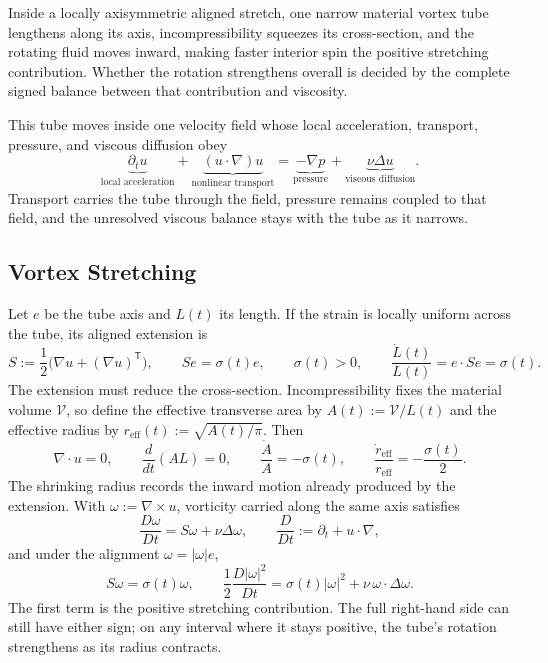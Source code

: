 
Inside a locally axisymmetric aligned stretch, one narrow material vortex tube lengthens along its axis, incompressibility squeezes its cross-section, and the rotating fluid moves inward, making faster interior spin the positive stretching contribution. Whether the rotation strengthens overall is decided by the complete signed balance between that contribution and viscosity.

This tube moves inside one velocity field whose local acceleration, transport, pressure, and viscous diffusion obey
\[
  \underbrace{\partial_t u}_{\text{local acceleration}}
  +
  \underbrace{(u\cdot\nabla)u}_{\text{nonlinear transport}}
  =
  \underbrace{-\nabla p}_{\text{pressure}}
  +
  \underbrace{\nu\Delta u}_{\text{viscous diffusion}}.
\]
Transport carries the tube through the field, pressure remains coupled to that field, and the unresolved viscous balance stays with the tube as it narrows.

\subsection{Vortex Stretching}\label{sub:ThePerfectlyStretchingVortex}

Let \(e\) be the tube axis and \(L(t)\) its length. If the strain is locally uniform across the tube, its aligned extension is
\[
  S:=\frac12\bigl(\nabla u+(\nabla u)^{\mathsf T}\bigr),
  \qquad
  Se=\sigma(t)e,
  \qquad
  \sigma(t)>0,
  \qquad
  \frac{\dot L(t)}{L(t)}
  =
  e\cdot Se
  =
  \sigma(t).
\]
The extension must reduce the cross-section. Incompressibility fixes the material volume \(\mathcal V\), so define the effective transverse area by \(A(t):=\mathcal V/L(t)\) and the effective radius by \(r_{\mathrm{eff}}(t):=\sqrt{A(t)/\pi}\). Then
\[
  \nabla\cdot u=0,
  \qquad
  \frac{d}{dt}(A L)=0,
  \qquad
  \frac{\dot A}{A}=-\sigma(t),
  \qquad
  \frac{\dot r_{\mathrm{eff}}}{r_{\mathrm{eff}}}
  =
  -\frac{\sigma(t)}{2}.
\]
The shrinking radius records the inward motion already produced by the extension. With \(\omega:=\nabla\times u\), vorticity carried along the same axis satisfies
\[
  \frac{D\omega}{Dt}
  =
  S\omega+\nu\Delta\omega,
  \qquad
  \frac{D}{Dt}
  :=
  \partial_t+u\cdot\nabla,
\]
and under the alignment \(\omega=|\omega|e\),
\[
  S\omega
  =
  \sigma(t)\omega,
  \qquad
  \frac12\frac{D|\omega|^2}{Dt}
  =
  \sigma(t)|\omega|^2
  +
  \nu\,\omega\cdot\Delta\omega.
\]
The first term is the positive stretching contribution. The full right-hand side can still have either sign; on any interval where it stays positive, the tube's rotation strengthens as its radius contracts.

